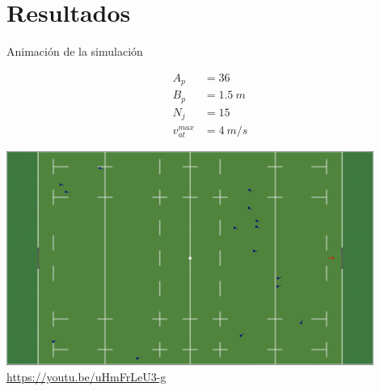 \section{Resultados}\label{sec:resultados}

\begin{frame}{Animación de la simulación}
    \begin{center}
        \begin{minipage}[c]{0.15\textwidth}
            \begin{equation*}
                \begin{aligned}
                    A_p &= 36 \\
                    B_p &= 1.5\ m \\
                    N_j &= 15 \\
                    v_{at}^{max} &= 4\ m/s
                \end{aligned}
            \end{equation*}
        \end{minipage}
        \hfill
        \begin{minipage}[c]{0.80\textwidth}
            \includegraphics[width=0.9\textwidth]{pic/05-resultados/animation-preview}
            \tiny{\href{https://youtu.be/uHmFrLeU3-g}{https://youtu.be/uHmFrLeU3-g}}
        \end{minipage}
    \end{center}
\end{frame}

